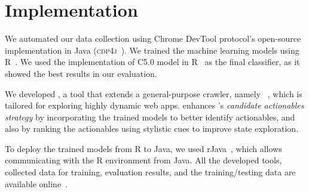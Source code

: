 
\section{Implementation}
\label{sec:implementation}

We automated our data collection using Chrome DevTool protocol's
open-source implementation in Java (\textsc{cdp4j}~\cite{chrome-dev-tools-java}).
We trained the machine learning models
using \textsc{R}~\cite{r}.
We used the implementation of C5.0 model in R~\cite{c50}
as the final classifier,
as it showed the best results in our evaluation.

We developed \toolName,
a tool that extends a general-purpose crawler, namely \crawljax~\cite{Mesbah:2012:Crawljax}, 
which is tailored for exploring highly dynamic web apps. \toolName enhances \crawljax's \textit{candidate actionables strategy}
by incorporating the trained models
to better identify actionables,
and also by ranking the actionables 
using stylistic cues
to improve state exploration.

To deploy the trained models from R to Java,
we used rJava~\cite{rjava}, which allows communicating with the R environment from Java.
All the developed tools, 
collected data for training,
evaluation results, 
and the training/testing data are available online~\cite{experimental-data}.
